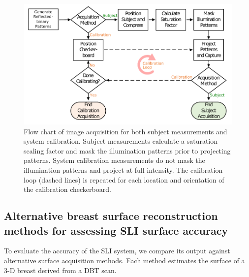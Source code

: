 \begin{figure}
    \begin{center}
    \includegraphics[width=.9\textwidth]{fig/omci/sli_flowchart.pdf}
    \end{center}
    \caption{Flow chart of image acquisition for both subject measurements and system calibration. Subject measurements calculate a saturation scaling factor and mask the illumination patterns prior to projecting patterns. System calibration measurements do not mask the illumination patterns and project at full intensity. The calibration loop (dashed lines) is repeated for each location and orientation of the calibration checkerboard.} 
    \label{fig:sli_flowchart}
\end{figure} 

\subsection{Alternative breast surface reconstruction methods for assessing SLI surface accuracy}
To evaluate the accuracy of the SLI system, we compare its output against alternative surface acquisition methods. Each method estimates the surface of a 3-D breast derived from a DBT scan.

